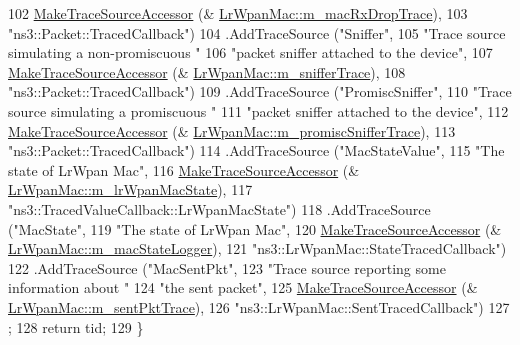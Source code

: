 \begin{DoxyCode}
102                      \hyperlink{group__tracing_gab21a770b9855af4e8f69f7531ea4a6b0}{MakeTraceSourceAccessor} (&
      \hyperlink{classns3_1_1LrWpanMac_ac06545ba350f6e2bc5d771213875bdf6}{LrWpanMac::m\_macRxDropTrace}),
103                      \textcolor{stringliteral}{"ns3::Packet::TracedCallback"})
104     .AddTraceSource (\textcolor{stringliteral}{"Sniffer"},
105                      \textcolor{stringliteral}{"Trace source simulating a non-promiscuous "}
106                      \textcolor{stringliteral}{"packet sniffer attached to the device"},
107                      \hyperlink{group__tracing_gab21a770b9855af4e8f69f7531ea4a6b0}{MakeTraceSourceAccessor} (&
      \hyperlink{classns3_1_1LrWpanMac_a8940ff6f40ddf5d73e5c550cb0317729}{LrWpanMac::m\_snifferTrace}),
108                      \textcolor{stringliteral}{"ns3::Packet::TracedCallback"})
109     .AddTraceSource (\textcolor{stringliteral}{"PromiscSniffer"},
110                      \textcolor{stringliteral}{"Trace source simulating a promiscuous "}
111                      \textcolor{stringliteral}{"packet sniffer attached to the device"},
112                      \hyperlink{group__tracing_gab21a770b9855af4e8f69f7531ea4a6b0}{MakeTraceSourceAccessor} (&
      \hyperlink{classns3_1_1LrWpanMac_a39b7fdffc860b187b9f316d78127d51f}{LrWpanMac::m\_promiscSnifferTrace}),
113                      \textcolor{stringliteral}{"ns3::Packet::TracedCallback"})
114     .AddTraceSource (\textcolor{stringliteral}{"MacStateValue"},
115                      \textcolor{stringliteral}{"The state of LrWpan Mac"},
116                      \hyperlink{group__tracing_gab21a770b9855af4e8f69f7531ea4a6b0}{MakeTraceSourceAccessor} (&
      \hyperlink{classns3_1_1LrWpanMac_ab5cdfd39de7397d658d300961dab3ed0}{LrWpanMac::m\_lrWpanMacState}),
117                      \textcolor{stringliteral}{"ns3::TracedValueCallback::LrWpanMacState"})
118     .AddTraceSource (\textcolor{stringliteral}{"MacState"},
119                      \textcolor{stringliteral}{"The state of LrWpan Mac"},
120                      \hyperlink{group__tracing_gab21a770b9855af4e8f69f7531ea4a6b0}{MakeTraceSourceAccessor} (&
      \hyperlink{classns3_1_1LrWpanMac_a7545ecfb4bdf7436739d00507872d248}{LrWpanMac::m\_macStateLogger}),
121                      \textcolor{stringliteral}{"ns3::LrWpanMac::StateTracedCallback"})
122     .AddTraceSource (\textcolor{stringliteral}{"MacSentPkt"},
123                      \textcolor{stringliteral}{"Trace source reporting some information about "}
124                      \textcolor{stringliteral}{"the sent packet"},
125                      \hyperlink{group__tracing_gab21a770b9855af4e8f69f7531ea4a6b0}{MakeTraceSourceAccessor} (&
      \hyperlink{classns3_1_1LrWpanMac_ac389be9d8b495db627c8f1b8036054cb}{LrWpanMac::m\_sentPktTrace}),
126                      \textcolor{stringliteral}{"ns3::LrWpanMac::SentTracedCallback"})
127   ;
128   \textcolor{keywordflow}{return} tid;
129 \}
\end{DoxyCode}


